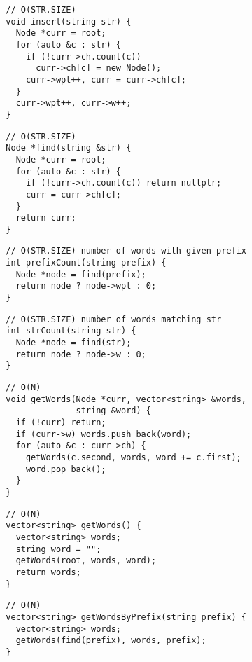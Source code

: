\documentclass[twoside]{article}
\begin{document}
\begin{multicols*}{2}
\begin{verbatim}
  // O(STR.SIZE)
  void insert(string str) {
    Node *curr = root;
    for (auto &c : str) {
      if (!curr->ch.count(c))
        curr->ch[c] = new Node();
      curr->wpt++, curr = curr->ch[c];
    }
    curr->wpt++, curr->w++;
  }
\end{verbatim}
\vspace{-12pt}
\begin{verbatim}
  // O(STR.SIZE)
  Node *find(string &str) {
    Node *curr = root;
    for (auto &c : str) {
      if (!curr->ch.count(c)) return nullptr;
      curr = curr->ch[c];
    }
    return curr;
  }
\end{verbatim}
\vspace{-12pt}
\begin{verbatim}
  // O(STR.SIZE) number of words with given prefix
  int prefixCount(string prefix) {
    Node *node = find(prefix);
    return node ? node->wpt : 0;
  }
\end{verbatim}
\vspace{-12pt}
\begin{verbatim}
  // O(STR.SIZE) number of words matching str
  int strCount(string str) {
    Node *node = find(str);
    return node ? node->w : 0;
  }
\end{verbatim}
\vspace{-12pt}
\begin{verbatim}
  // O(N)
  void getWords(Node *curr, vector<string> &words,
                string &word) {
    if (!curr) return;
    if (curr->w) words.push_back(word);
    for (auto &c : curr->ch) {
      getWords(c.second, words, word += c.first);
      word.pop_back();
    }
  }
\end{verbatim}
\vspace{-12pt}
\begin{verbatim}
  // O(N)
  vector<string> getWords() {
    vector<string> words;
    string word = "";
    getWords(root, words, word);
    return words;
  }
\end{verbatim}
\vspace{-12pt}
\begin{verbatim}
  // O(N)
  vector<string> getWordsByPrefix(string prefix) {
    vector<string> words;
    getWords(find(prefix), words, prefix);
  }
\end{verbatim}
\vspace{-12pt}
\begin{verbatim}

\end{verbatim}
\end{multicols*}
\end{document}
